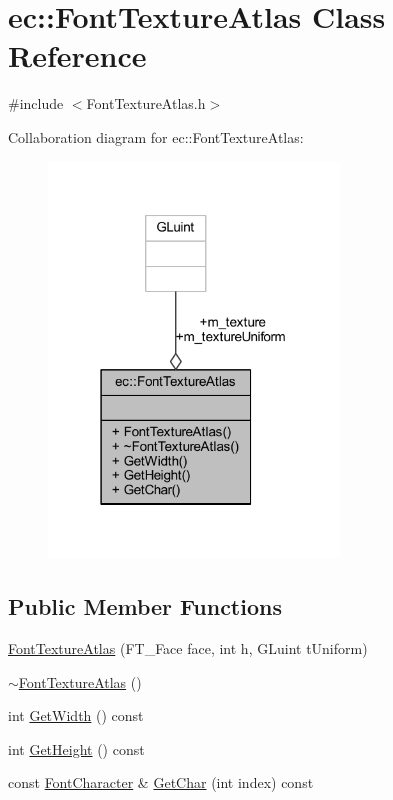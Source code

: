 \hypertarget{classec_1_1_font_texture_atlas}{}\section{ec\+:\+:Font\+Texture\+Atlas Class Reference}
\label{classec_1_1_font_texture_atlas}


{\ttfamily \#include $<$Font\+Texture\+Atlas.\+h$>$}



Collaboration diagram for ec\+:\+:Font\+Texture\+Atlas\+:\nopagebreak
\begin{figure}[H]
\begin{center}
\leavevmode
\includegraphics[width=219pt]{classec_1_1_font_texture_atlas__coll__graph}
\end{center}
\end{figure}
\subsection*{Public Member Functions}
\begin{DoxyCompactItemize}
\item 
\mbox{\hyperlink{classec_1_1_font_texture_atlas_abf42f99b2562130eb9b347c895cf14f3}{Font\+Texture\+Atlas}} (F\+T\+\_\+\+Face face, int h, G\+Luint t\+Uniform)
\item 
\mbox{\hyperlink{classec_1_1_font_texture_atlas_a9e520505ca5bd5b9cabe27448d285449}{$\sim$\+Font\+Texture\+Atlas}} ()
\item 
int \mbox{\hyperlink{classec_1_1_font_texture_atlas_a7d6691e9cf4550b29d4fc70ace0e136a}{Get\+Width}} () const
\item 
int \mbox{\hyperlink{classec_1_1_font_texture_atlas_a769ac35e4572cf02cc76b4c6740801bc}{Get\+Height}} () const
\item 
const \mbox{\hyperlink{structec_1_1_font_character}{Font\+Character}} \& \mbox{\hyperlink{classec_1_1_font_texture_atlas_a7bde9cda25b2a6ec8536f68cb31ee0f0}{Get\+Char}} (int index) const
\end{DoxyCompactItemize}
